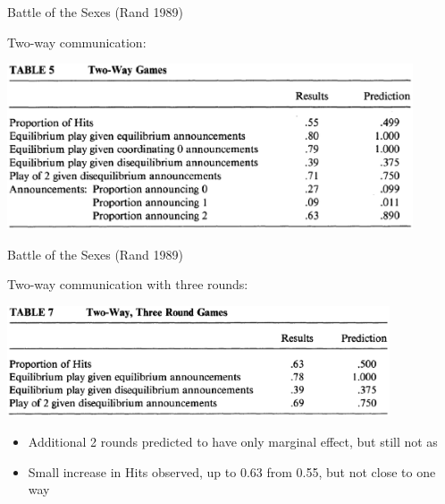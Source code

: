 \documentclass{beamer}
\begin{document}
\begin{frame}{Battle of the Sexes (Rand 1989)}
	\begin{card}
	Two-way communication:

	\begin{center}
		\includegraphics[width=0.9\textwidth]{./i/cdfr1989Tbl5.eps}
	\end{center}
	\end{card}
\end{frame}
\begin{frame}{Battle of the Sexes (Rand 1989)}
	\begin{card}
	Two-way communication with three rounds:

	\begin{center}
		\includegraphics[width=0.85\textwidth]{./i/cdfr1989Tbl7.eps}
	\end{center}
	\end{card}
	
	\begin{card}
    	\begin{itemize}
    		\item Additional 2 rounds predicted to have only marginal effect, but still not as 
    		\item Small increase in Hits observed, up to 0.63 from 0.55, but not close to one way
    	\end{itemize}
    \end{card}
\end{frame}
\end{document}
